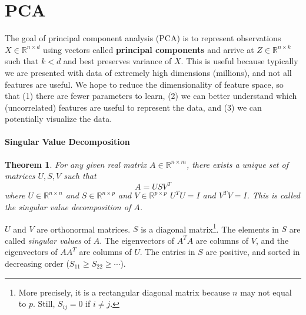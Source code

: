 \documentclass[12pt]{article}
\title{}
\newtheorem{theorem}{Theorem}[section]
\theoremstyle{definition}
\begin{document}
\pagestyle{fancy}
\fancyhf{} %
\cfoot{\thepage}
\renewcommand{\headrulewidth}{1pt}



\section{PCA}

The goal of principal component analysis (PCA) is to represent observations $X\in\mathbb{R}^{n\times d}$ using vectors called \textbf{principal components} and arrive at $Z\in\mathbb{R}^{n\times k}$ such that $k<d$ and best preserves variance of $X$.
This is useful because typically we are presented with data of extremely high dimensions (millions), and not all features are useful. We hope to reduce the dimensionality of feature space, so that (1) there are fewer parameters to learn, (2) we can better understand which (uncorrelated) features are useful to represent the data, and (3) we can potentially visualize the data.

\paragraph{Singular Value Decomposition}
\begin{theorem}
  For any given real matrix $A\in\mathbb{R}^{n\times m}$, there exists a unique set of matrices $U, S, V$ such that
  \begin{equation}
    A = USV^T
  \end{equation}
  where $U\in\mathbb{R}^{n\times n}$ and $S\in\mathbb{R}^{n\times p}$ and $V\in\mathbb{R}^{p\times p}$ $U^TU=I$ and $V^TV=I$. This is called the \emph{singular value decomposition} of $A$.
\end{theorem}
$U$ and $V$ are orthonormal matrices. $S$ is a diagonal matrix\footnote{More precisely, it is a rectangular diagonal matrix because $n$ may not equal to $p$. Still, $S_{ij}=0$ if $i\neq j$.}. The elements in $S$ are called \emph{singular values} of $A$. The eigenvectors of $A^TA$ are columns of $V$, and the eigenvectors of $AA^T$ are columns of $U$. The entries in $S$ are positive, and sorted in decreasing order ($S_{11}\geq S_{22}\geq\cdots$).






\end{document}
